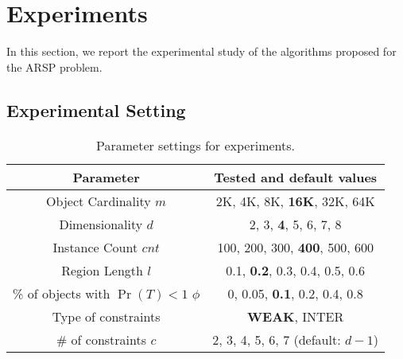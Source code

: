\section{Experiments}\label{sec:experiments}

In this section, we report the experimental study of the algorithms proposed for the ARSP problem.

\subsection{Experimental Setting}

\begin{table}[t]
	\centering
	\caption{Parameter settings for experiments.}
	\label{tab:parameters}
	\begin{tabular}{|c|c|}
		\hline
		\textbf{Parameter} & \textbf{Tested and default values} \\ \hline \hline
		Object Cardinality $m$ & {2K, 4K, 8K, \textbf{16K}, 32K, 64K } \\ \hline
        Dimensionality $d$ & {2, 3, \textbf{4}, 5, 6, 7, 8}	\\ \hline	
		Instance Count $cnt$ & {100, 200, 300, \textbf{400}, 500, 600} \\ \hline
		Region Length $l$ & {0.1, \textbf{0.2}, 0.3, 0.4, 0.5, 0.6} \\ \hline
		\% of objects with $\Pr(T) < 1$ $\phi$ & {0, 0.05, \textbf{0.1}, 0.2, 0.4, 0.8} \\ \hline
		Type of constraints & {\sc \bf WEAK}, {\sc INTER} \\ \hline
		\# of constraints $c$ & 2, 3, 4, 5, 6, 7 (default: $d - 1$) \\ \hline
	\end{tabular}
\end{table}


